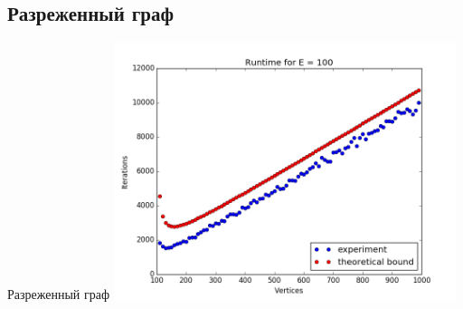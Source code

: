 \documentclass{beamer}
\begin{document}
 \subsection{Разреженный граф}
 \begin{frame}{Разреженный граф}
  \includegraphics[width=10cm]{pic/rarefied_graph.png}
 \end{frame}
\end{document}
